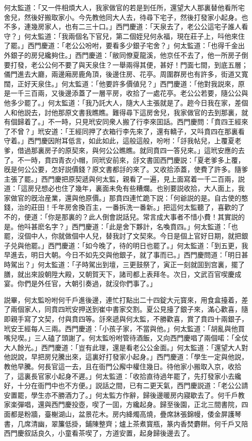 何太監道：「又一件相煩大人，我家做官的若是到任所，還望大人那裏替他看所宅舍兒，然後好搬取家小。今先教他同大人去，待尋下宅子，然後打發家小起身。也不多，連幾房家人，也有二三十口。」西門慶道：「天泉去了，老公公這宅子誰人看守？」何太監道：「我兩個名下官兒，第二個姪兒何永福，現在莊子上，呌他來住了罷。」西門慶道：「老公公吩咐，要看多少銀子宅舍？」何太監道：「也得千金出外銀子的房兒纔夠住。」西門慶道：「敝同僚夏龍溪，他京任不去了，他一所房子倒要打發，老公公何不要了與天泉住？一舉兩得其便，甚好！門面七間，到底五層；儀門進去大廳，兩邊廂房鹿角頂，後邊住房、花亭。周圍群房也有許多，街道又寬闊，正好天泉住。」何太監道：「他要許多價値兒？」西門慶道：「他對我説來，原是一千三百兩，又後邊添蓋了一層平房，收拾了一處花亭。老公公若要，隨公公與他多少罷了。」何太監道：「我乃託大人，隨大人主張就是了。趂今日我在家，差個人和他説去，討他那原文書我瞧瞧。難得尋下這房舍兒，我家做官的去到那裏，就有個歸着了。」不一時，只見玳安同衆人搬了行李來囬話。西門慶問：「賁四王經來了不曾？」玳安道：「王經同押了衣箱行李先來了，還有轎子，又呌賁四在那裏看守着。」西門慶因附耳低言，如此如此，這般這般，吩咐：「㧱我帖兒，上覆夏老爹，借過那裏房子的原契來，與何公公瞧瞧。就同賁四一答兒來。」這玳安應的去了。不一時，賁四青衣小帽，同玳安前來，㧱文書囬西門慶説：「夏老爹多上覆，旣是何公公要，怎好説價錢？原文書都㧱的來了。又收拾添蓋，使費了許多。隨爹主張了罷。」西門慶把原契遞與何太監，親看了一遍，見上面寫着一千二百兩，説道：「這房兒想必也住了幾年，裏面未免有些糟爛。也别要説收拾，大人面上，我家做官的旣治産業，還與他原價。」那賁四連忙跪下説：「何爺説的是。自古使的憨錢，治的莊田！千年房舍換百主，一番拆洗一番新。」把這何太監聽了，喜歡的了不的，便道：「你是那裏的？此人倒會説話兒。常言成大事者不惜小費！其實説的是。他呌甚麽名字？」西門慶道：「此是舍下夥計，名喚賁四。」何太監道：「也罷，沒個中人，你就做個中人兒，替我討了文契來。今日是個上官好日期，就把銀子兑與他罷。」西門慶道：「如今晚了，待的明日也罷了。」何太監道：「到五更，我早進去，明日大朝。今日不如先交與他銀子，就了事而已。」西門慶問道：「明日甚時駕出？」何太監道：「子時駕出到壇，三更鼓祭了，寅正一刻就囬到宫裏，擺了膳，就出來設朝陞大殿，又朝賀天下，諸司都上表拜冬。次日，文武百官喫慶成宴。你們是外任官，大朝引奏過，就沒你們事了。」

説畢，何太監吩咐何千戶進後邊，連忙打點出二十四錠大元寳來，用食盒擡着，差了兩個家人，同賁四玳安押送到崔中書家交割。夏公見擡了銀子來，滿心歡喜，隨即親手寫了文契，付與賁四等。㧱來遞與何太監，不勝歡喜，賞了賁四十兩銀子，玳安王經每人三兩。西門慶道：「小孩子家，不當與他。」何太監道：「胡亂與他買嘴兒喫。」三人磕了頭謝了。何太監吩咐管待酒飯，又向西門慶唱了兩個喏：「全仗大人餘光。」西門慶道：「豈有此理，還是看老公公金面。」何太監道：「還望大人對他説說，早把房兒騰出來，這裏好打發家小起身。」西門慶道：「學生一定與他説，教他早騰。何長官這一去，且在衙門公廨中權住幾日。待他家小搬取入京，收拾了，這裏長官家小起身不遲。」何太監道：「收拾直待過年罷了，先打發家小去纔好，十分在衙門中也不方便。」説話之間，已有二更天氣，西門慶説道：「老公公請安置罷，學生亦不勝酒力了。」何太監方作辭，歸後邊暖房内寢歇去了。何千戶教家楽彈唱，還與西門慶投壺，喫了一囬，方纔起身。歸至後園，正北三間書院，四面都是粉牆，臺榭湖山，盆景花木。房内絳燭高燒，疊席牀張錦幔，倭金屏護琴書，几席清幽，翠簾低掛，鋪陳整齊；爐上茶煮寳瓶，篆内香焚麝餅。何千戶又陪西門慶叙話良久，小童看茶喫了，方道安置，起身歸後邊去了。

